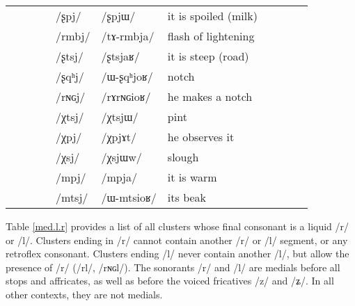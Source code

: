 \documentclass[oldfontcommands,oneside,a4paper,11pt]{article}
\newcommand{\ipa}[1]{/#1/} %
\newcommand{\tib}[1]{\cellcolor{lightgray}\textbf{#1}}
\begin{document}
\begin{table}
{\begin{tabular}{l|lll|lll|lll|l}
 &	 &	&&\ipa{ʂpj} &	\ipa{ʂpjɯ} &	it is spoiled (milk)\\
 &	 &	&&\ipa{rmbj} &	\ipa{tɤ-rmbja} &	flash of lightening\\
 &	 &	&&\ipa{ʂtsj} &	\ipa{ʂtsjaʁ} &it is steep (road)	\\
 &	 &	&&\ipa{ʂqʰj} &	\ipa{ɯ-ʂqʰjoʁ} &notch	\\
 &	 &	&&\ipa{rɴɢj} &	\ipa{rɤrɴɢioʁ} &	he makes a notch\\
\midrule
 &	 &	&&\ipa{χtsj} &	\ipa{χtsjɯ} &pint	\\
 &	 &	&&\ipa{χpj} \tib{}&	\ipa{χpjɤt} &he  observes it	\\
 &	 &	&&\ipa{χsj} &	\ipa{χsjɯw} &	slough \\
\midrule
 &	 &	&&\ipa{mpj} &	\ipa{mpja} &	it is warm\\
 &	 &	&&\ipa{mtsj} &	\ipa{ɯ-mtsioʁ} &its beak	\\
\end{tabular}}
\end{table}
 
  
  Table  \ref{med.l.r} provides a  list of all clusters whose final consonant is a liquid  \ipa{r} or \ipa{l}. Clusters ending in \ipa{r} cannot contain another \ipa{r} or \ipa{l} segment, or any retroflex consonant. Clusters ending \ipa{l} never contain another \ipa{l}, but allow the presence of \ipa{r} (\ipa{rl}, \ipa{rɴɢl}). The sonorants \ipa{r} and \ipa{l} are medials before all stops and affricates, as well as before the voiced fricatives \ipa{z} and \ipa{ʑ}. In all other contexts, they are not medials.
  
\end{document}
